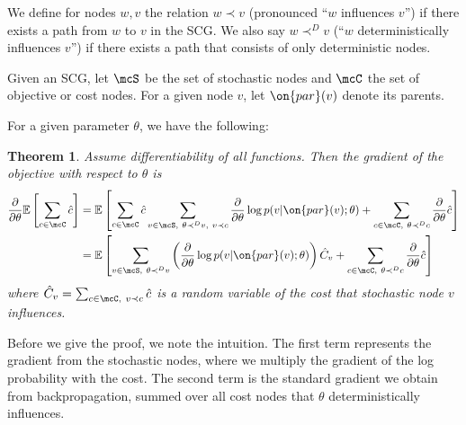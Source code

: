 \documentclass[12pt]{report}
\newtheorem{theorem}{Theorem}
\begin{document}
We define for nodes $w,v$ the relation $w \prec v$ (pronounced ``$w$ influences $v$'') if there exists a path from $w$ to $v$ in the SCG. We also say $w \prec^D v$ (``$w$ deterministically influences $v$'') if there exists a path that consists of only deterministic nodes.

Given an SCG, let $\mcS$ be the set of stochastic nodes and $\mcC$ the set of objective or cost nodes. For a given node $v$, let $\on{par}(v)$ denote its parents.

For a given parameter $\theta$, we have the following:
\begin{theorem}
Assume differentiability of all functions. Then the gradient of the objective with respect to $\theta$ is
\begin{align}
\frac{\partial}{\partial \theta} \mathbb{E}\left[ \sum_{c \in \mcC} \hat{c} \right] &= \mathbb{E}\left[\sum_{c \in \mcC} \hat{c} \sum_{v \in \mcS,~\theta \prec^D v, ~v \prec c }  \frac{\partial}{\partial\theta} \log p(v | \on{par}(v) ; \theta )  +
 \sum_{c\in \mcC,~\theta \prec^D c} \frac{\partial}{\partial \theta} \hat{c}
\right] \label{eq:gradient1} \\
&=  \mathbb{E}\left[ \sum_{v \in \mcS,~\theta \prec^D v} \left( \frac{\partial}{\partial\theta} \log p(v | \on{par}(v) ; \theta ) \right) \hat{C}_v + \sum_{c\in \mcC,~\theta \prec^D c} \frac{\partial}{\partial \theta} \hat{c} \label{eq:gradient2}
\right] 
\end{align}
where $\hat{C}_v = \sum_{c \in \mcC, ~v \prec c} \hat{c}$ is a random variable of the cost that stochastic node $v$ influences.
\label{thm:gradient}
\end{theorem}
Before we give the proof, we note the intuition. The first term represents the gradient from the stochastic nodes, where we multiply the gradient of the log probability with the cost.
The second term is the standard gradient we obtain from backpropagation, summed over all cost nodes that $\theta$ deterministically influences.
\end{document}
